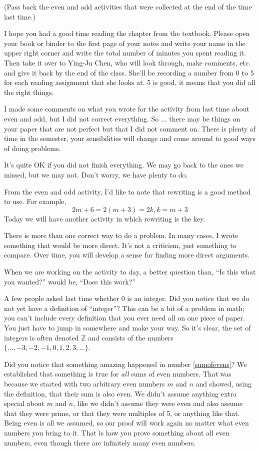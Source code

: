 
(Pass back the even and odd activities that were collected at the end of the time last time.)

I hope you had a good time reading the chapter from the textbook.
Please open your book or binder to the first page of your notes and write your name in the upper right corner and write the total number of minutes you spent reading it.
Then take it over to Ying-Ju Chen, who will look through, make comments, etc. and give it back by the end of the class.
She'll be recording a number from 0 to 5 for each reading assignment that she looks at.
5 is good, it means that you did all the right things.

I made some comments on what you wrote for the activity from last time about even and odd, but I did not correct everything.
So ... there may be things on your paper that are not perfect but that I did not comment on.
There is plenty of time in the semester, your sensibilities will change and come around to good ways of doing problems.

It's quite OK if you did not finish everything.
We may go back to the ones we missed, but we may not.
Don't worry, we have plenty to do.

From the even and odd activity, I'd like to note that rewriting is a good method to use.  For example,
\[
    2m+6 = 2(m+3) = 2k, k = m+3
\]
Today we will have another activity in which rewriting is the key.

There is more than one correct way to do a problem.
In many cases, I wrote something that would be more direct.
It's not a criticism, just something to compare.
Over time, you will develop a sense for finding more direct arguments.

When we are working on the activity to day, a better question than, ``Is this what you wanted?'' would be, ``Does this work?''

A few people asked last time whether 0 is an integer.
Did you notice that we do not yet have a definition of ``integer''?
This can be a bit of a problem in math; you can't include every definition that you ever need all on one piece of paper.
You just have to jump in somewhere and make your way.
So it's clear, the set of integers is often denoted $\mathbb{Z}$ and consists of the numbers $\{\ldots, -3, -2, -1, 0, 1, 2, 3, \ldots \}$.

Did you notice that something amazing happened in number \ref{sumofevens}?
We established that something is true for {\em all} sums of even numbers.
That was because we started with two arbitrary even numbers $m$ and $n$ and showed, using the definition, that their sum is also even.
We didn't assume anything extra special about $m$ and $n$, like we didn't assume they were even and also assume that they were prime, or that they were multiples of 5, or anything like that.
Being even is all we assumed, so our proof will work again no matter what even numbers you bring to it.
That is how you prove something about all even numbers, even though there are infinitely many even numbers.
